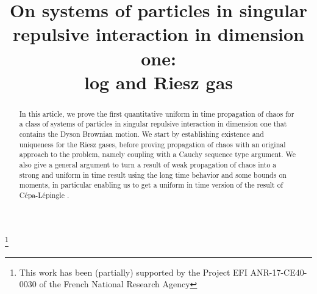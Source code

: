 \documentclass[JEP,XML,SOM,Unicode,published]{cedram}
\theoremstyle{plain}
\theoremstyle{definition}
\begin{document}
\title[On systems of particles in singular repulsive interaction in dimension one: log and Riesz gas]{On systems of particles in singular repulsive interaction in dimension one:\\ log and Riesz gas}

\author[\initial{A.} \lastname{Guillin}]{ }
\address{Laboratoire de Mathématiques Blaise Pascal - Université Clermont-Auvergne\\
3 Place Vasarely,
63178 Aubière cedex, France\\
\& Institut Universitaire de France}

\author[\initial{P.} \lastname{Le Bris}]{ }
\address{Laboratoire Jacques-Louis Lions - Sorbonne Université\\
75252 Paris cedex 05, France}

\author[\initial{P.} \lastname{Monmarché}]{ }
\address{Laboratoire Jacques-Louis Lions - Sorbonne Université\\
75252 Paris cedex 05, France}

\thanks{This work has been (partially) supported by the Project EFI ANR-17-CE40-0030 of the French National Research Agency}

\begin{abstract}
In this article, we prove the first quantitative uniform in time propagation of chaos for a class of systems of particles in singular repulsive interaction in dimension one that contains the Dyson Brownian motion. We start by establishing existence and uniqueness for the Riesz gases, before proving propagation of chaos with an original approach to the problem, namely coupling with a Cauchy sequence type argument. We also give a general argument to turn a result of weak propagation of chaos into a strong and uniform in time result using the long time behavior and some bounds on moments, in particular enabling us to get a uniform in time version of the result of Cépa-Lépingle \cite{cepa_lepingle}.
\end{abstract}


\end{document}
